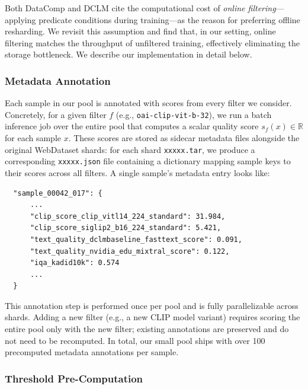 Both DataComp and DCLM cite the computational cost of \emph{online filtering}---applying predicate conditions during training---as the reason for preferring offline resharding.
We revisit this assumption and find that, in our setting, online filtering matches the throughput of unfiltered training, effectively eliminating the storage bottleneck.
We describe our implementation in detail below.

\subsubsection{Metadata Annotation}

Each sample in our pool is annotated with scores from every filter we consider.
Concretely, for a given filter $f$ (e.g., \texttt{oai-clip-vit-b-32}), we run a batch inference job over the entire pool that computes a scalar quality score $s_f(x) \in \mathbb{R}$ for each sample $x$.
These scores are stored as sidecar metadata files alongside the original WebDataset shards: for each shard \texttt{xxxxx.tar}, we produce a corresponding \texttt{xxxxx.json} file containing a dictionary mapping sample keys to their scores across all filters.
A single sample's metadata entry looks like:
\begin{verbatim}
  "sample_00042_017": {
      ...
      "clip_score_clip_vitl14_224_standard": 31.984,
      "clip_score_siglip2_b16_224_standard": 5.421,
      "text_quality_dclmbaseline_fasttext_score": 0.091,
      "text_quality_nvidia_edu_mixtral_score": 0.122,
      "iqa_kadid10k": 0.574
      ...
  }
\end{verbatim}
This annotation step is performed once per pool and is fully parallelizable across shards.
Adding a new filter (e.g., a new CLIP model variant) requires scoring the entire pool only with the new filter; existing annotations are preserved and do not need to be recomputed.
In total, our small pool ships with over 100 precomputed metadata annotations per sample.

\subsubsection{Threshold Pre-Computation}

